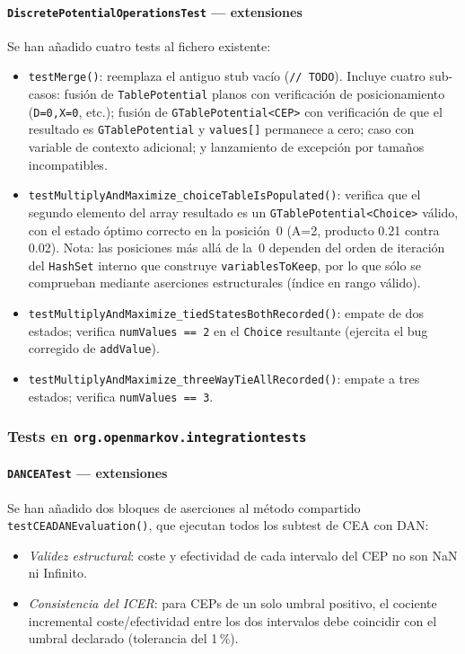 \documentclass[11pt,a4paper]{article}
\newcommand{\code}[1]{\texttt{#1}}
\begin{document}
\paragraph{\code{DiscretePotentialOperationsTest} --- extensiones}
Se han añadido cuatro tests al fichero existente:
\begin{itemize}
  \item \code{testMerge()}: reemplaza el antiguo stub vacío (\code{// TODO}).
        Incluye cuatro sub-casos: fusión de \code{TablePotential} planos con
        verificación de posicionamiento (\code{D=0,X=0}, etc.); fusión de
        \code{GTablePotential<CEP>} con verificación de que el resultado es
        \code{GTablePotential} y \code{values[]} permanece a cero; caso con
        variable de contexto adicional; y lanzamiento de excepción por tamaños
        incompatibles.
  \item \code{testMultiplyAndMaximize\_choiceTableIsPopulated()}: verifica que el
        segundo elemento del array resultado es un \code{GTablePotential<Choice>}
        válido, con el estado óptimo correcto en la posición~0 (A=2, producto
        0.21 contra 0.02).  Nota: las posiciones más allá de la~0 dependen del
        orden de iteración del \code{HashSet} interno que construye
        \code{variablesToKeep}, por lo que sólo se comprueban mediante aserciones
        estructurales (índice en rango válido).
  \item \code{testMultiplyAndMaximize\_tiedStatesBothRecorded()}: empate de dos
        estados; verifica \code{numValues == 2} en el \code{Choice} resultante
        (ejercita el bug corregido de \code{addValue}).
  \item \code{testMultiplyAndMaximize\_threeWayTieAllRecorded()}: empate a tres
        estados; verifica \code{numValues == 3}.
\end{itemize}

\subsubsection*{Tests en \code{org.openmarkov.integrationtests}}

\paragraph{\code{DANCEATest} --- extensiones}
Se han añadido dos bloques de aserciones al método compartido
\code{testCEADANEvaluation()}, que ejecutan todos los subtest de CEA con DAN:
\begin{itemize}
  \item \emph{Validez estructural}: coste y efectividad de cada intervalo del CEP
        no son NaN ni Infinito.
  \item \emph{Consistencia del ICER}: para CEPs de un solo umbral positivo, el
        cociente incremental coste/efectividad entre los dos intervalos debe
        coincidir con el umbral declarado (tolerancia del 1\,\%).
\end{itemize}
\end{document}
